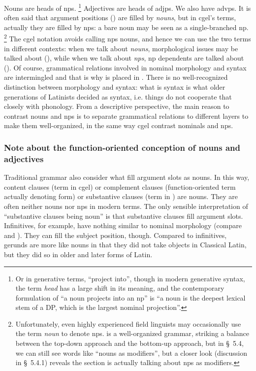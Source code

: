 \documentclass{article}
\newcommand*{\citesec}[1]{\S~{#1}}
\newcommand*{\term}[1]{\emph{#1}}
\begin{document}
Nouns are heads of \ac{np}s.%
\footnote{
    Or in generative terms, ``project into'', though in modern generative syntax,
    the term \term{head} has a large shift in its meaning,
    and the contemporary formulation of ``a noun projects into an \ac{np}''
    is ``a noun is the deepest lexical stem of a DP, 
    which is the largest nominal projection''.
}
Adjectives are heads of \ac{adjp}s. We also have \ac{advp}s.
It is often said that argument positions () are filled by \emph{nouns},
but in \ac{cgel}'s terms, actually they are filled by \ac{np}s:
a bare noun may be seen as a single-branched \ac{np}.%
\footnote{
    Unfortunately, even highly experienced field linguists 
    may occasionally use the term \term{noun} to denote \ac{np}s.
    \citet{friesen2017grammar} is a well-organized grammar,
    striking a balance between the top-down approach and the bottom-up approach,
    but in \citesec{5.4},
    we can still see words like ``nouns as modifiers'',
    but a closer look (discussion in \citesec{5.4.1}) reveals the section is actually talking about 
    \ac{np}s as modifiers.
}
The \ac{cgel} notation avoids calling \ac{np}s nouns, 
and hence we can use the two terms in different contexts:
when we talk about \term{nouns},
morphological issues may be talked about (),
while when we talk about \term{\ac{np}s},
\ac{np} dependents are talked about ().
Of course, grammatical relations involved in nominal morphology and syntax are intermingled
and that is why  is placed in .
There is no well-recognized distinction between morphology and syntax:
what is syntax is what older generations of Latinists decided as syntax,
i.e. things do not cooperate that closely with phonology.
From a descriptive perspective, 
the main reason to contrast nouns and \ac{np}s 
is to separate grammatical relations to different layers
to make them well-organized,
in the same way \ac{cgel} contrast nominals and \ac{np}s.

\subsubsection{Note about the function-oriented conception of nouns and adjectives}

Traditional grammar also consider what fill argument slots as nouns.
In this way, content clauses (term in \ac{cgel}) 
or complement clauses (function-oriented term actually denoting form) 
or substantive clauses (term in \citet{allen1903allen})
are nouns.
They are often neither nouns nor \ac{np}s in modern terms.
The only sensible interpretation of ``substantive clauses being noun''
is that substantive clauses fill argument slots.
Infinitives, for example, have nothing similar to nominal morphology 
(compare  and ).
They can fill the subject position, though.
Compared to infinitives, 
gerunds are more like nouns in that they did not take objects in Classical Latin,
but they did so in older and later forms of Latin.
\end{document}
